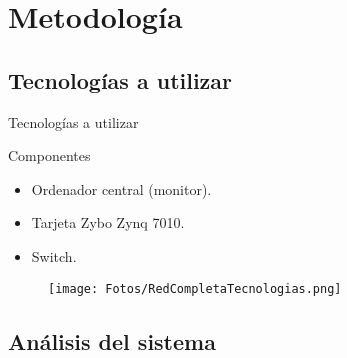 \documentclass[aspectratio=169]{beamer}
\begin{document}
\section{Metodología}

\subsection{Tecnologías a utilizar}
\begin{frame}{Tecnologías a utilizar}
\begin{block}{Componentes}
	\begin{itemize}
		\item Ordenador central (monitor).
		\item Tarjeta Zybo Zynq 7010.
		\item Switch.
	\end{itemize}
\end{block}
\begin{figure}[h]
\centering
\texttt{[image: Fotos/RedCompletaTecnologias.png]}
\end{figure}
\end{frame}

\subsection{Análisis del sistema}
\end{document}
